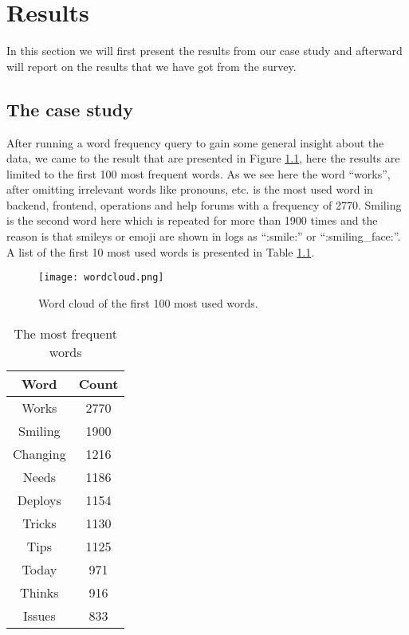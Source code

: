 \chapter{Results}
In this section we will first present the results from our case study and afterward will report on the results that we have got from the survey.

\section{The case study}

After running a word frequency query to gain some general insight about the data, we came to the result that are presented in Figure \ref{fig:wordcloud}, here the results are limited to the first 100 most frequent words. As we see here the word “works”, after omitting irrelevant words like pronouns, etc. is the most used word in backend, frontend, operations and help forums with a frequency of 2770. Smiling is the second word here which is repeated for more than 1900 times and the reason is that smileys or emoji are shown in logs as “:smile:” or “:smiling\_face:”. A list of the first 10 most used words is presented in Table \ref{table:word}.

\begin{figure}[hbt!]
\centering
\texttt{[image: wordcloud.png]}
\caption{Word cloud of the first 100 most used words.}\label{fig:wordcloud}
\end{figure}

\begin{table}
\centering
\caption{The most frequent words} \label{table:word}
\begin{tabular}{cc}
\hline
\textbf{Word} & \textbf{Count} \\ \hline
Works & 2770 \\
Smiling & 1900 \\
Changing & 1216 \\
Needs & 1186 \\
Deploys & 1154 \\
Tricks & 1130 \\
Tips & 1125 \\
Today & 971 \\
Thinks & 916 \\
Issues & 833 \\
\hline
\end{tabular}
\end{table}


